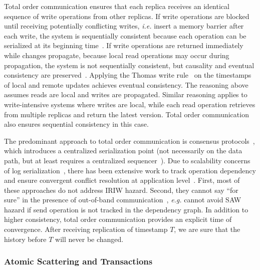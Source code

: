 Total order communication ensures that each replica receives an identical sequence of write operations from other replicas.
If write operations are blocked until receiving potentially conflicting writes, \textit{i.e.} insert a memory barrier after each write, the system is sequentially consistent because each operation can be serialized at its beginning time~\cite{lu2016snow}.
If write operations are returned immediately while changes propagate, because local read operations may occur during propagation, the system is not sequentially consistent, but causality and eventual consistency are preserved~\cite{terry1995managing}.
Applying the Thomas write rule~\cite{thomas1979majority} on the timestamps of local and remote updates achieves eventual consistency.
The reasoning above assumes reads are local and writes are propagated.
Similar reasoning applies to write-intensive systems where writes are local, while each read operation retrieves from multiple replicas and return the latest version.
Total order communication also ensures sequential consistency in this case.

The predominant approach to total order communication is consensus protocols~\cite{lamport1998part,raft}, which introduces a centralized serialization point (not necessarily on the data path, but at least requires a centralized sequencer~\cite{kaminsky2016design}).
Due to scalability concerns of log serialization~\cite{anna}, there has been extensive work to track operation dependency and ensure convergent conflict resolution at application level~\cite{lloyd2011don,lloyd2013stronger}.
First, most of these approaches do not address IRIW hazard.
Second, they cannot say ``for sure'' in the presence of out-of-band communication~\cite{cheriton1994understanding}, \textit{e.g.} cannot avoid SAW hazard if send operation is not tracked in the dependency graph.
In addition to higher consistency, total order communication provides an explicit time of convergence.
After receiving replication of timestamp $T$, we are sure that the history before $T$ will never be changed.

\subsubsection{Atomic Scattering and Transactions}
\label{subsec:transactional-kvs}

